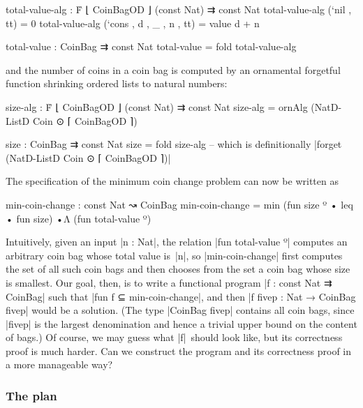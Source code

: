 \begin{code}
total-value-alg : Ḟ ⌊ CoinBagOD ⌋ (const Nat) ⇉ const Nat
total-value-alg (`nil   ,              tt) = 0
total-value-alg (`cons  , d , _ , n ,  tt) = value d + n

total-value : CoinBag ⇉ const Nat
total-value = fold total-value-alg
\end{code}
and the number of coins in a coin bag is computed by an ornamental forgetful function shrinking ordered lists to natural numbers:
\begin{code}
size-alg : Ḟ ⌊ CoinBagOD ⌋ (const Nat) ⇉ const Nat
size-alg = ornAlg (NatD-ListD Coin ⊙ ⌈ CoinBagOD ⌉)

size : CoinBag ⇉ const Nat
size = fold size-alg
-- which is definitionally |forget (NatD-ListD Coin ⊙ ⌈ CoinBagOD ⌉)|
\end{code}
The specification of the minimum coin change problem can now be written as
\begin{code}
min-coin-change : const Nat ↝ CoinBag
min-coin-change = min (fun size º • leq • fun size) •Λ (fun total-value º)
\end{code}
Intuitively, given an input |n : Nat|, the relation |fun total-value º| computes an arbitrary coin bag whose total value is~|n|, so |min-coin-change| first computes the set of all such coin bags and then chooses from the set a coin bag whose size is smallest.
Our goal, then, is to write a functional program |f : const Nat ⇉ CoinBag| such that |fun f ⊆ min-coin-change|, and then |f {fivep} : Nat → CoinBag fivep| would be a solution.
(The type |CoinBag fivep| contains all coin bags, since |fivep| is the largest denomination and hence a trivial upper bound on the content of bags.)
Of course, we may guess what |f|~should look like, but its correctness proof is much harder.
Can we construct the program and its correctness proof in a more manageable way?

\subsubsection{The plan}

